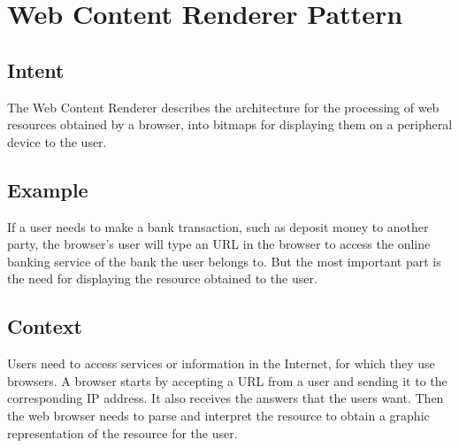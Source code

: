 \documentclass{sig-alternate-05-2015}
\begin{document}
\section{Web Content Renderer Pattern}

  \subsection*{Intent}

  The Web Content Renderer describes the architecture for the processing of web resources obtained by a browser, into bitmaps for displaying them on a peripheral device to the user.

  \subsection*{Example}
  If a user needs to make a bank transaction, such as deposit money to another party, the browser's user will type an URL in the browser to access the online banking service of the bank the user belongs to. But the most important part is the need for displaying the resource obtained to the user.
  
  \subsection*{Context}
  Users need to access services or information in the Internet, for which they use browsers. A browser starts by accepting a URL from a user and sending it to the corresponding IP address. It also receives the answers that the users want. Then the web browser needs to parse and interpret the resource to obtain a graphic representation of the resource for the user.
\end{document}
